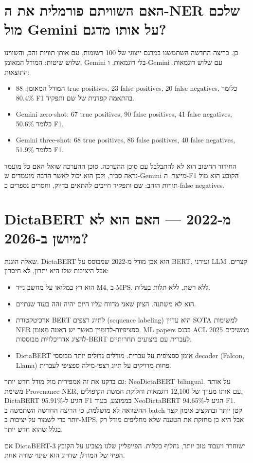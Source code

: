 \documentclass[12pt,a4paper]{article}
\begin{document}
\section{\texthebrew{האם השוויתם פורמלית את ה-NER שלכם מול Gemini על אותו מדגם?}}
\begin{hebrew}
כן. בריצה החדשה השתמשנו במדגם ייצוגי של 100 רשומות, עם אותן תוויות זהב, והשווינו שלוש שיטות: המודל המאומן, Gemini בלי דוגמאות, ו-Gemini עם שלוש דוגמאות. התוצאות:
\begin{itemize}
  \item המודל המאומן: 88 true positives, 23 false positives, 20 false negatives, כלומר 80.4\% F1 בהתאמה קפדנית של שם ותפקיד.
  \item Gemini zero-shot: 67 true positives, 90 false positives, 41 false negatives, כלומר 50.6\% F1.
  \item Gemini three-shot: 68 true positives, 86 false positives, 40 false negatives, כלומר 51.9\% F1.
\end{itemize}
\par
החידוד החשוב הוא לא להתבלבל עם סוכן ההערכה. סוכן ההערכה שואל האם כל מועמד נראה סביר, ולכן הוא יכול לאשר הרבה מועמדים ש-Gemini מייצר. ה-F1 הקובע הוא מול תוויות הזהב: שם ותפקיד חייבים להתאים בדיוק, וחסרים נספרים כ-false negatives.
\end{hebrew}


\section{\texthebrew{DictaBERT מ-2022 — האם הוא לא מיושן ב-2026?}}
\begin{hebrew}
שאלה הוגנת. DictaBERT הוא אכן מודל מ-2022 שמבוסס על BERT, ועידני LLM קצרים. אבל היציבות שלו היא יתרון, לא חיסרון:
\begin{itemize}
  \item הוא רץ במלואו על מחשב נייד M4, ב-MPS. ללא רשת, ללא תלות בעלות.
  \item הוא לא משתנה. הציון שאני מדווח עליו היום יהיה זהה בעוד שנתיים.
  \item ארכיטקטורת BERT לתיוג רצפים (sequence labeling) היא עדיין SOTA למשימות NER ספציפיות-לדומיין כאשר יש דאטה מאומן. ML papers בכנס ACL 2025 ממשיכים להציג אדריכלויות מבוססות-BERT לעברית עם ביצועים תחרותיים.
  \item DictaBERT אומן ספציפית על עברית. מודלים גדולים יותר מבוססי decoder (Falcon, Llama) פחות מדויקים על תיוג רצפי-מילה ספציפי לעברית.
\end{itemize}
\par
גם בדקנו את זה אמפירית מול מודל חדש יותר: \textenglish{NeoDictaBERT bilingual}. על אותה משימת \textenglish{Provenance NER}, עם אותו מערך של 12,100 דוגמאות וחלוקת חמשת הקיפולים, \textenglish{DictaBERT} הגיע ל-\textenglish{95.91\% F1} בממוצע, בעוד \textenglish{NeoDictaBERT} הגיע ל-\textenglish{94.65\% F1}. ההשוואה לא מושלמת, כי הריצה החדשה השתמשה ב-batch קטן יותר ובתקציב אימון קצר יותר כדי לשמור על יציבות ב-\textenglish{MPS}, אבל היא כן מחזקת את הטענה שלא מחליפים מודל רק בגלל שהוא חדש יותר.
\par
אם DictaBERT-3 ישוחרר ויעבוד טוב יותר, נחליף בקלות. הפייפליין שלנו מצביע על הקובץ הפיזי של המודל; שדרוג הוא שינוי שורה אחת.
\end{hebrew}
\end{document}
